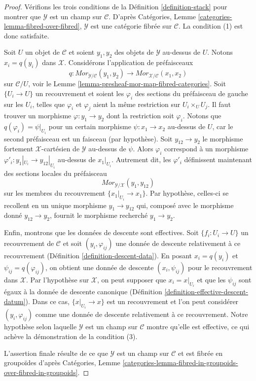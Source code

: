 \begin{proof}
Vérifions les trois conditions de la Définition \ref{definition-stack}
pour montrer que $\mathcal{Y}$ est un champ sur $\mathcal{C}$.
D'après Catégories, Lemme \ref{categories-lemma-fibred-over-fibred},
$\mathcal{Y}$ est une catégorie fibrée sur $\mathcal{C}$.
La condition (1) est donc satisfaite.

\medskip\noindent
Soit $U$ un objet de $\mathcal{C}$ et soient $y_1, y_2$ des objets
de $\mathcal{Y}$ au-dessus de $U$. Notons $x_i = q(y_i)$ dans $\mathcal{X}$.
Considérons l'application de préfaisceaux
$$
q : \mathit{Mor}_{\mathcal{Y}/\mathcal{C}}(y_1, y_2)
\longrightarrow
\mathit{Mor}_{\mathcal{X}/\mathcal{C}}(x_1, x_2)
$$
sur $\mathcal{C}/U$, voir le Lemme \ref{lemma-presheaf-mor-map-fibred-categories}.
Soit $\{U_i \to U\}$ un recouvrement et soient les $\varphi_i$ des sections
du préfaisceau de gauche sur les $U_i$, telles que $\varphi_i$ et
$\varphi_j$ aient la même restriction sur $U_i \times_U U_j$.
Il faut trouver un morphisme $\varphi : y_1 \to y_2$ dont la restriction soit $\varphi_i$.
Notons que $q(\varphi_i) = \psi|_{U_i}$ pour un certain morphisme
$\psi : x_1 \to x_2$ au-dessus de $U$, car le second préfaisceau est un faisceau
(par hypothèse). Soit $y_{12} \to y_2$ le morphisme fortement
$\mathcal{X}$-cartésien de $\mathcal{Y}$ au-dessus de $\psi$. Alors $\varphi_i$ correspond
à un morphisme $\varphi'_i : y_1|_{U_i} \to y_{12}|_{U_i}$ au-dessus de $x_1|_{U_i}$.
Autrement dit, les $\varphi'_i$ définissent maintenant des sections locales du préfaisceau
$$
\mathit{Mor}_{\mathcal{Y}/\mathcal{X}}(y_1, y_{12})
$$
sur les membres du recouvrement $\{x_1|_{U_i} \to x_1\}$. Par hypothèse, celles-ci
se recollent en un unique morphisme $y_1 \to y_{12}$ qui, composé avec le morphisme
donné $y_{12} \to y_2$, fournit le morphisme recherché $y_1 \to y_2$.

\medskip\noindent
Enfin, montrons que les données de descente sont effectives. Soit $\{f_i : U_i \to U\}$
un recouvrement de $\mathcal{C}$ et soit $(y_i, \varphi_{ij})$ une donnée de descente
relativement à ce recouvrement (Définition \ref{definition-descent-data}).
En posant $x_i = q(y_i)$ et $\psi_{ij} = q(\varphi_{ij})$,
on obtient une donnée de descente $(x_i, \psi_{ij})$ pour le recouvrement dans $\mathcal{X}$.
Par l'hypothèse sur $\mathcal{X}$, on peut supposer que $x_i = x|_{U_i}$
et que les $\psi_{ij}$ sont égaux à la donnée de descente canonique
(Définition \ref{definition-effective-descent-datum}).
Dans ce cas, $\{x|_{U_i} \to x\}$ est un recouvrement et l'on peut considérer
$(y_i, \varphi_{ij})$ comme une donnée de descente relativement à ce recouvrement.
Notre hypothèse selon laquelle $\mathcal{Y}$ est un champ sur $\mathcal{C}$
montre qu'elle est effective, ce qui achève la démonstration de la condition (3).

\medskip\noindent
L'assertion finale résulte de ce que $\mathcal{Y}$ est un champ sur
$\mathcal{C}$ et est fibrée en groupoïdes d'après
Catégories, Lemme
\ref{categories-lemma-fibred-in-groupoids-over-fibred-in-groupoids}.
\end{proof}





